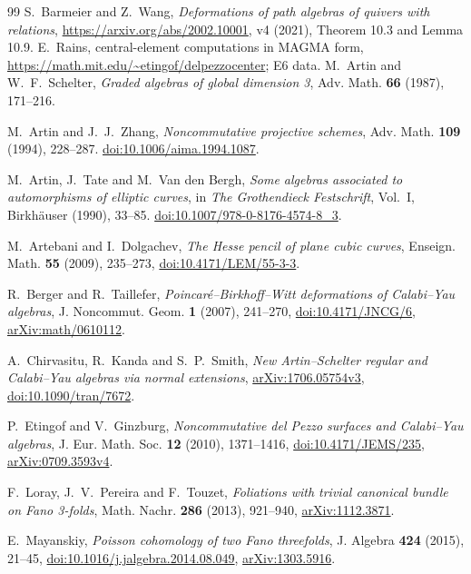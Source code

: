 \documentclass[11pt,a4paper]{ltjsarticle}
\numberwithin{equation}{section}
\begin{document}
\begin{thebibliography}{99}
 S.~Barmeier and Z.~Wang,
\emph{Deformations of path algebras of quivers with relations},
\url{https://arxiv.org/abs/2002.10001}, v4 (2021), Theorem 10.3 and Lemma 10.9.
 E.~Rains, central-element computations in MAGMA form,
\url{https://math.mit.edu/~etingof/delpezzocenter}; E6 data.
M.~Artin and W.~F.~Schelter,
\textit{Graded algebras of global dimension 3},
Adv. Math. \textbf{66} (1987), 171--216.

M.~Artin and J.~J.~Zhang,
\textit{Noncommutative projective schemes},
Adv. Math. \textbf{109} (1994), 228--287.
\href{https://doi.org/10.1006/aima.1994.1087}{doi:10.1006/aima.1994.1087}.

M.~Artin, J.~Tate and M.~Van den Bergh,
\textit{Some algebras associated to automorphisms of elliptic curves},
in \textit{The Grothendieck Festschrift}, Vol.~I,
Birkh\"auser (1990), 33--85.
\href{https://doi.org/10.1007/978-0-8176-4574-8_3}{doi:10.1007/978-0-8176-4574-8\_3}.

M.~Artebani and I.~Dolgachev,
\textit{The Hesse pencil of plane cubic curves},
Enseign. Math. \textbf{55} (2009), 235--273,
\href{https://doi.org/10.4171/LEM/55-3-3}{doi:10.4171/LEM/55-3-3}.

R.~Berger and R.~Taillefer,
\textit{Poincar\'e--Birkhoff--Witt deformations of Calabi--Yau algebras},
J. Noncommut. Geom. \textbf{1} (2007), 241--270,
\href{https://doi.org/10.4171/JNCG/6}{doi:10.4171/JNCG/6},
\href{https://arxiv.org/abs/math/0610112}{arXiv:math/0610112}.

A.~Chirvasitu, R.~Kanda and S.~P.~Smith,
\textit{New Artin--Schelter regular and Calabi--Yau algebras via normal extensions},
\href{https://arxiv.org/abs/1706.05754}{arXiv:1706.05754v3},
\href{https://doi.org/10.1090/tran/7672}{doi:10.1090/tran/7672}.

P.~Etingof and V.~Ginzburg,
\textit{Noncommutative del Pezzo surfaces and Calabi--Yau algebras},
J. Eur. Math. Soc. \textbf{12} (2010), 1371--1416,
\href{https://doi.org/10.4171/JEMS/235}{doi:10.4171/JEMS/235},
\href{https://arxiv.org/abs/0709.3593}{arXiv:0709.3593v4}.

F.~Loray, J.~V.~Pereira and F.~Touzet,
\textit{Foliations with trivial canonical bundle on Fano 3-folds},
Math. Nachr. \textbf{286} (2013), 921--940,
\href{https://arxiv.org/abs/1112.3871}{arXiv:1112.3871}.

E.~Mayanskiy,
\textit{Poisson cohomology of two Fano threefolds},
J. Algebra \textbf{424} (2015), 21--45,
\href{https://doi.org/10.1016/j.jalgebra.2014.08.049}{doi:10.1016/j.jalgebra.2014.08.049},
\href{https://arxiv.org/abs/1303.5916}{arXiv:1303.5916}.


\end{thebibliography}
\end{document}
